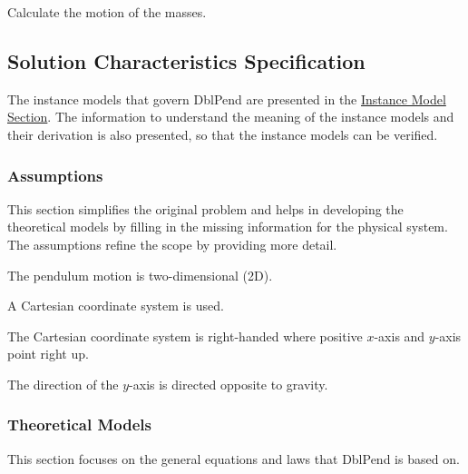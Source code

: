 \documentclass[12pt]{article}
\begin{document}
\begin{description}[font=\normalfont]
\item[motionMass:\phantomsection\label{motionMass}]{Calculate the motion of the masses.}
\end{description}
\subsection{Solution Characteristics Specification}
\label{Sec:SolCharSpec}
The instance models that govern DblPend are presented in the \hyperref[Sec:IMs]{Instance Model Section}. The information to understand the meaning of the instance models and their derivation is also presented, so that the instance models can be verified.

\subsubsection{Assumptions}
\label{Sec:Assumps}
This section simplifies the original problem and helps in developing the theoretical models by filling in the missing information for the physical system. The assumptions refine the scope by providing more detail.

\begin{description}[font=\normalfont]
\item[twoDMotion:\phantomsection\label{twoDMotion}]{The pendulum motion is two-dimensional (2D).}
\item[cartSys:\phantomsection\label{cartSys}]{A Cartesian coordinate system is used.}
\item[cartSysR:\phantomsection\label{cartSysR}]{The Cartesian coordinate system is right-handed where positive $x$-axis and $y$-axis point right up.}
\item[yAxisDir:\phantomsection\label{yAxisDir}]{The direction of the $y$-axis is directed opposite to gravity.}
\end{description}
\subsubsection{Theoretical Models}
\label{Sec:TMs}
This section focuses on the general equations and laws that DblPend is based on.
\end{document}
